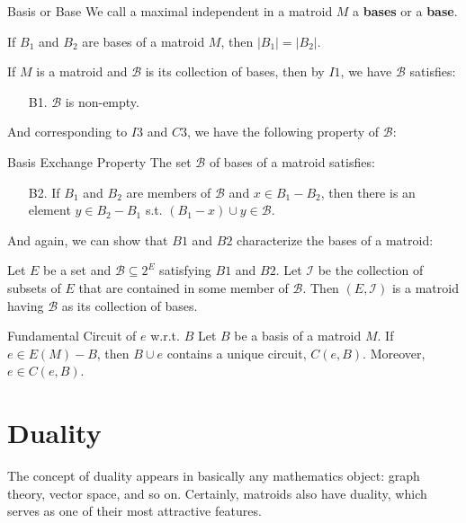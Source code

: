 \documentclass[a4paper,10pt]{article}
\renewcommand{\vocab}[1]{\textbf{#1}}
\newcommand{\II}{\mathcal{I}}
\newcommand{\BB}{\mathcal{B}}
\begin{document}
\begin{definition}[def:]{Basis or Base}
  We call a maximal independent in a matroid $M$ a \vocab{bases} or a \vocab{base}.
\end{definition}

\begin{lemma}[lem:]{}
  If $B_1$ and $B_2$ are bases of a matroid $M$, then $|B_1|=|B_2|$.
\end{lemma}

If $M$ is a matroid and $\BB$ is its collection of bases, then by $I1$, we have $\BB$ satisfies:
\begin{enumerate}
  \item [B1.] $\BB$ is non-empty.
\end{enumerate}
And corresponding to $I3$ and $C3$, we have the following property of $\BB$:

\begin{lemma}[lem:]{Basis Exchange Property}
  The set $\BB$ of bases of a matroid satisfies:
  \begin{enumerate}
    \item [B2.] If $B_1$ and $B_2$ are members of $\BB$ and $x\in B_1-B_2$, then there is an element $y\in B_2-B_1$ s.t. $(B_1-x)\cup y\in \BB$.
  \end{enumerate}
\end{lemma}

And again, we can show that $B1$ and $B2$ characterize the bases of a matroid:
\begin{theorem}[thm:]{}
  Let $E$ be a set and $\BB\subseteq 2^E$ satisfying $B1$ and $B2$. Let $\II$ be the collection of subsets of $E$ that are contained in some member of $\BB$. Then $(E,\II)$ is a matroid having $\BB$ as its collection of bases.
\end{theorem}

\begin{corollary}{Fundamental Circuit of $e$ w.r.t. $B$}
  Let $B$ be a basis of a matroid $M$. If $e\in E(M)-B$, then $B\cup e$ contains a unique circuit, $C(e,B)$. Moreover, $e\in C(e,B)$.
\end{corollary}

\section{Duality}

The concept of duality appears in basically any mathematics object: graph theory, vector space, and so on. Certainly, matroids also have duality, which serves as one of their most attractive features.
\end{document}
